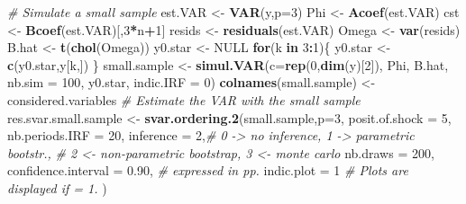 \documentclass[
  12pt,
]{book}
\newenvironment{Shaded}{\begin{snugshade}}{\end{snugshade}}
\newcommand{\AttributeTok}[1]{\textcolor[rgb]{0.13,0.29,0.53}{#1}}
\newcommand{\CommentTok}[1]{\textcolor[rgb]{0.56,0.35,0.01}{\textit{#1}}}
\newcommand{\ConstantTok}[1]{\textcolor[rgb]{0.56,0.35,0.01}{#1}}
\newcommand{\ControlFlowTok}[1]{\textcolor[rgb]{0.13,0.29,0.53}{\textbf{#1}}}
\newcommand{\DecValTok}[1]{\textcolor[rgb]{0.00,0.00,0.81}{#1}}
\newcommand{\FloatTok}[1]{\textcolor[rgb]{0.00,0.00,0.81}{#1}}
\newcommand{\FunctionTok}[1]{\textcolor[rgb]{0.13,0.29,0.53}{\textbf{#1}}}
\newcommand{\NormalTok}[1]{#1}
\newcommand{\OtherTok}[1]{\textcolor[rgb]{0.56,0.35,0.01}{#1}}
\newcommand{\SpecialCharTok}[1]{\textcolor[rgb]{0.81,0.36,0.00}{\textbf{#1}}}
\theoremstyle{definition}
\theoremstyle{definition}
\theoremstyle{definition}
\theoremstyle{definition}
\theoremstyle{remark}
\begin{document}
\begin{Shaded}
\begin{Highlighting}[]
\CommentTok{\# Simulate a small sample}
\NormalTok{est.VAR }\OtherTok{\textless{}{-}} \FunctionTok{VAR}\NormalTok{(y,}\AttributeTok{p=}\DecValTok{3}\NormalTok{)}
\NormalTok{Phi     }\OtherTok{\textless{}{-}} \FunctionTok{Acoef}\NormalTok{(est.VAR)}
\NormalTok{cst     }\OtherTok{\textless{}{-}} \FunctionTok{Bcoef}\NormalTok{(est.VAR)[,}\DecValTok{3}\SpecialCharTok{*}\NormalTok{n}\SpecialCharTok{+}\DecValTok{1}\NormalTok{]}
\NormalTok{resids  }\OtherTok{\textless{}{-}} \FunctionTok{residuals}\NormalTok{(est.VAR)}
\NormalTok{Omega   }\OtherTok{\textless{}{-}} \FunctionTok{var}\NormalTok{(resids)}
\NormalTok{B.hat   }\OtherTok{\textless{}{-}} \FunctionTok{t}\NormalTok{(}\FunctionTok{chol}\NormalTok{(Omega))}
\NormalTok{y0.star }\OtherTok{\textless{}{-}} \ConstantTok{NULL}
\ControlFlowTok{for}\NormalTok{(k }\ControlFlowTok{in} \DecValTok{3}\SpecialCharTok{:}\DecValTok{1}\NormalTok{)\{}
\NormalTok{  y0.star }\OtherTok{\textless{}{-}} \FunctionTok{c}\NormalTok{(y0.star,y[k,])}
\NormalTok{\}}
\NormalTok{small.sample }\OtherTok{\textless{}{-}} \FunctionTok{simul.VAR}\NormalTok{(}\AttributeTok{c=}\FunctionTok{rep}\NormalTok{(}\DecValTok{0}\NormalTok{,}\FunctionTok{dim}\NormalTok{(y)[}\DecValTok{2}\NormalTok{]),}
\NormalTok{                          Phi,}
\NormalTok{                          B.hat,}
                          \AttributeTok{nb.sim =} \DecValTok{100}\NormalTok{,}
\NormalTok{                          y0.star,}
                          \AttributeTok{indic.IRF =} \DecValTok{0}\NormalTok{)}
\FunctionTok{colnames}\NormalTok{(small.sample)  }\OtherTok{\textless{}{-}}\NormalTok{ considered.variables}
\CommentTok{\# Estimate the VAR with the small sample}
\NormalTok{res.svar.small.sample }\OtherTok{\textless{}{-}}
  \FunctionTok{svar.ordering.2}\NormalTok{(small.sample,}\AttributeTok{p=}\DecValTok{3}\NormalTok{,}
                  \AttributeTok{posit.of.shock =} \DecValTok{5}\NormalTok{,}
                  \AttributeTok{nb.periods.IRF =} \DecValTok{20}\NormalTok{,}
                  \AttributeTok{inference =} \DecValTok{2}\NormalTok{,}\CommentTok{\# 0 {-}\textgreater{} no inference, 1 {-}\textgreater{} parametric bootstr.,}
                  \CommentTok{\# 2 \textless{}{-} non{-}parametric bootstrap, 3 \textless{}{-} monte carlo}
                  \AttributeTok{nb.draws =} \DecValTok{200}\NormalTok{,}
                  \AttributeTok{confidence.interval =} \FloatTok{0.90}\NormalTok{, }\CommentTok{\# expressed in pp.}
                  \AttributeTok{indic.plot =} \DecValTok{1} \CommentTok{\# Plots are displayed if = 1.}
\NormalTok{  )}
\end{Highlighting}
\end{Shaded}
\end{document}
